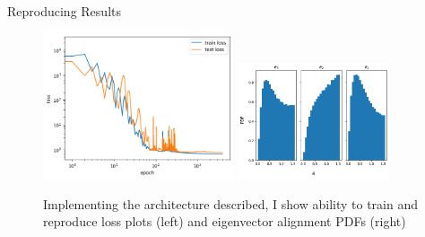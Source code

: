 \begin{frame}{Reproducing Results}
  \begin{figure}
    \centering
    \includegraphics[width=0.5\textwidth]{trained_tbnn_loss.png}%
    \includegraphics[width=0.4\textwidth]{tbnn_ph_eig_align.png}
    \caption{Implementing the architecture described, I show ability to train and reproduce loss plots (left) and eigenvector alignment PDFs (right)}
  \end{figure}
\end{frame}

